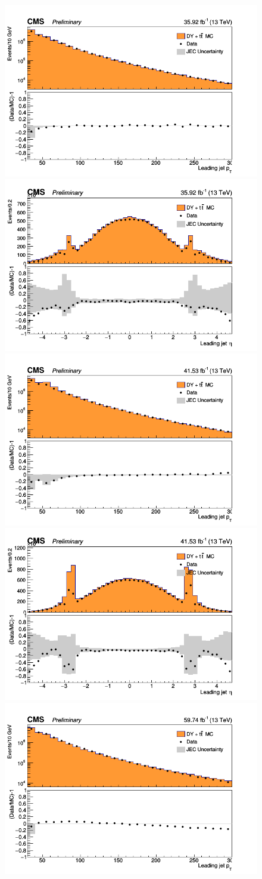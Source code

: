 \begin{figure}[!h]
\centering
\includegraphics[width=0.49\linewidth]{Figures/Jets/leadingJet_Pt_2016June24.png}
\includegraphics[width=0.49\linewidth]{Figures/Jets/leadingJet_Eta_2016June24.png} \\
\includegraphics[width=0.49\linewidth]{Figures/Jets/leadingJet_Pt_2017June24.png}
\includegraphics[width=0.49\linewidth]{Figures/Jets/leadingJet_Eta_2017June24.png} \\
\includegraphics[width=0.49\linewidth]{Figures/Jets/leadingJet_Pt_2018June24.png}

\end{figure}
